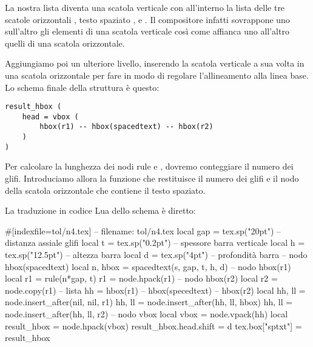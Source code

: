 La nostra lista diventa una scatola verticale con all'interno la lista delle tre
scatole orizzontali , testo spaziato , e
. Il compositore infatti sovrappone uno sull'altro gli elementi di
una scatola verticale così come affianca uno all'altro quelli di una scatola
orizzontale.

Aggiungiamo poi un ulteriore livello, inserendo la scatola verticale a sua volta
in una scatola orizzontale per fare in modo di regolare l'allineamento alla
linea base. Lo schema finale della struttura è questo:
\begin{Verbatim}[numbers=none]
result_hbox (
    head = vbox (
        hbox(r1) -- hbox(spacedtext) -- hbox(r2)
    )
)
\end{Verbatim}

Per calcolare la lunghezza dei nodi rule  e , dovremo
conteggiare il numero dei glifi. Introduciamo allora la funzione 
che restituisce il numero dei glifi e il nodo della scatola orizzontale che
contiene il testo spaziato.

La traduzione in codice Lua dello schema è diretto:
\begin{lines}
#[indexfile=tol/n4.tex]
-- filename: tol/n4.tex
local gap = tex.sp("20pt") -- distanza assiale glifi
local t = tex.sp("0.2pt")  -- spessore barra verticale
local h = tex.sp("12.5pt") -- altezza barra
local d = tex.sp("4pt")    -- profondità barra
-- nodo hbox(spacedtext)
local n, hbox = spacedtext(s, gap, t, h, d)
-- nodo hbox(r1)
local r1 = rule(n*gap, t)
r1 = node.hpack(r1)
-- nodo hbox(r2)
local r2 = node.copy(r1)
-- lista hh = hbox(r1) -- hbox(specedtext) -- hbox(r2)
local hh, ll = node.insert_after(nil, nil, r1)
hh, ll = node.insert_after(hh, ll, hbox)
hh, ll = node.insert_after(hh, ll, r2)
-- nodo vbox
local vbox = node.vpack(hh)
local result_hbox = node.hpack(vbox)
result_hbox.head.shift = d
tex.box["sptxt"] = result_hbox
\end{lines}



